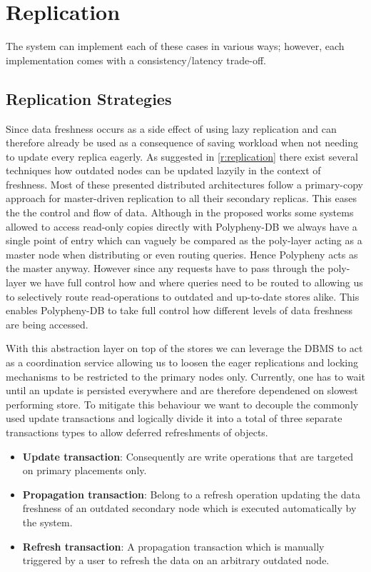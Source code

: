\section{Replication}
\label{sec:replication}

The system can implement each of these cases in various ways; however, each implementation comes with a consistency/latency trade-off.




\subsection{Replication Strategies}
\label{sec:replication_strategy}
Since data freshness occurs as a side effect of using lazy replication and can therefore already
be used as a consequence of saving workload when not needing to update every replica eagerly.
As suggested in \ref{r:replication} there exist several techniques how outdated nodes can be updated lazyily in the context of freshness.
Most of these presented distributed architectures follow a primary-copy approach for master-driven replication to all their secondary replicas.
This eases the the control and flow of data. Although in the proposed works some systems allowed to access read-only copies directly
with Polypheny-DB we always have a single point of entry which can vaguely be compared as the poly-layer acting as a master node
when distributing or even routing queries. Hence Polypheny acts as the master anyway. However since any requests have to pass through the poly-layer
we have full control how and where queries need to be routed to allowing us to selectively route read-operations to outdated and up-to-date stores alike.
This enables Polypheny-DB to take full control how different levels of data freshness are being accessed.

With this abstraction layer on top of the stores we can leverage the DBMS to act as a coordination service allowing us to loosen the eager replications and 
locking mechanisms to be restricted to the primary nodes only. Currently, one has to wait until an update is persisted everywhere and are therefore
dependened on slowest performing store.
To mitigate this behaviour we want to decouple the commonly used update transactions and logically divide it into a total of three separate transactions types
to allow deferred refreshments of objects.
\begin{itemize}
    \item \textbf{Update transaction}: Consequently are write operations that are targeted on primary placements only.
    \item \textbf{Propagation transaction}: Belong to a refresh operation updating the data freshness of an outdated secondary node which is 
    executed automatically by the system.
    \item \textbf{Refresh transaction}: A propagation transaction which is manually triggered by a user to refresh the data on an arbitrary outdated node.
\end{itemize}

